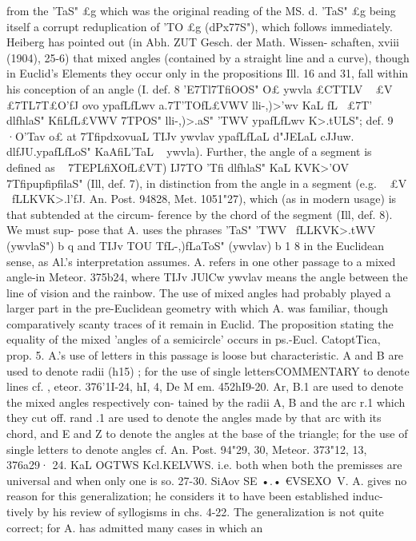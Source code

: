 {{{{{{{{{{{{{{from the 'TaS" £g which was the original
reading of the MS. d. 'TaS" £g being itself
a corrupt reduplication of 'TO £g (dPx77S"),
which follows immediately.
Heiberg has pointed out (in Abh. ZUT Gesch. der Math. Wissen-
schaften, xviii (1904), 25-6) that mixed angles (contained by a
straight line and a curve), though in Euclid's Elements they occur
only in the propositions Ill. 16 and 31, fall within his conception
of an angle (I. def. 8 'E7Tl7TfiOOS" O£ ywvla £CTTLV ~ £V £7TL7T£O'fJ ovo
ypafLfLwv a.7T'TOfL£VWV lli-,)>'wv KaL fL~ £7T' dlfhlaS" KfiLfL£VWV 7TPOS"
lli-,)>.aS" 'TWV ypafLfLwv K>.tULS"; def. 9 ·O'Tav o£ at 7TfipdxovuaL TIJv
ywvlav ypafLfLaL d"JELaL cJJuw. dlfJU.ypafLfLoS" KaAfiL'TaL ~ ywvla). Further,
the angle of a segment is defined as ~ 7TEPLfiXOfL£VT) IJ7TO 'Tfi dlfhlaS"
KaL KVK>'OV 7TfipupfipfilaS" (Ill, def. 7), in distinction from the angle
in a segment (e.g. ~ £V ~fLLKVK>.l'fJ. An. Post. 94828, Met. 1051"27),
which (as in modern usage) is that subtended at the circum-
ference by the chord of the segment (Ill, def. 8). We must sup-
pose that A. uses the phrases 'TaS" 'TWV ~fLLKVK>.tWV (ywvlaS") b q and
TIJv TOU TfL-,)fLaToS" (ywvlav) b 1 8 in the Euclidean sense, as Al.'s
interpretation assumes. A. refers in one other passage to a mixed
angle-in Meteor. 375b24, where TIJv JUlCw ywvlav means the angle
between the line of vision and the rainbow. The use of mixed
angles had probably played a larger part in the pre-Euclidean
geometry with which A. was familiar, though comparatively
scanty traces of it remain in Euclid. The proposition stating the
equality of the mixed 'angles of a semicircle' occurs in ps.-Eucl.
CatoptTica, prop. 5.
A.'s use of letters in this passage is loose but characteristic.
A and B are used to denote radii (h15) ; for the use of single lettersCOMMENTARY
to denote lines cf. ,\1 eteor. 376'1I-24, hI, 4, De M em. 452hI9-20.
Ar, B.1 are used to denote the mixed angles respectively con-
tained by the radii A, B and the arc r.1 which they cut off.
rand .1 are used to denote the angles made by that arc with its
chord, and E and Z to denote the angles at the base of the triangle;
for the use of single letters to denote angles cf. An. Post. 94"29,
30, Meteor. 373"12, 13, 376a29·
24. KaL OGTWS Kcl.KELVWS. i.e. both when both the premisses are
universal and when only one is so.
27-30. Si}Aov SE •.• €VSEXO~V. A. gives no reason for this
generalization; he considers it to have been established induc-
tively by his review of syllogisms in chs. 4-22. The generalization
is not quite correct; for A. has admitted many cases in which an
}}}}}}}}}}}}}
